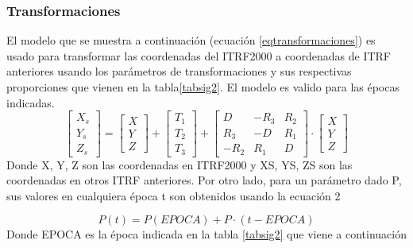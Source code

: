 \subsubsection{Transformaciones}
El modelo que se muestra a continuación (ecuación \eqref{eqtransformaciones}) es usado para transformar las coordenadas del ITRF2000 a coordenadas de ITRF anteriores usando los parámetros de transformaciones y sus respectivas proporciones que vienen en la tabla\ref{tabsig2}. El modelo es valido para las épocas indicadas.
\begin{equation}
  \begin{bmatrix}
    X_s \\
    Y_s \\
    Z_s
  \end{bmatrix} = \begin{bmatrix} X\\Y\\Z \end{bmatrix} + \begin{bmatrix}
    T_1\\T_2\\T_3
  \end{bmatrix} + \begin{bmatrix}
    D&- R_3&R_2 \\
    R_3&- D&R_1 \\
    -R_2&R_1&D
  \end{bmatrix}\cdot\begin{bmatrix}
    X\\Y\\Z
  \end{bmatrix}
  \label{eqtransformaciones}
\end{equation}
Donde X, Y, Z son las coordenadas en ITRF2000 y XS, YS, ZS son las coordenadas en otros ITRF anteriores.
 Por otro lado, para un parámetro dado P, sus valores en cualquiera época t son obtenidos usando la ecuación 2
                  
\begin{equation}
  P (t) = P(EPOCA) + P\cdot(t - EPOCA)
\end{equation}
Donde EPOCA es la época indicada en la tabla \ref{tabsig2} que viene a continuación

